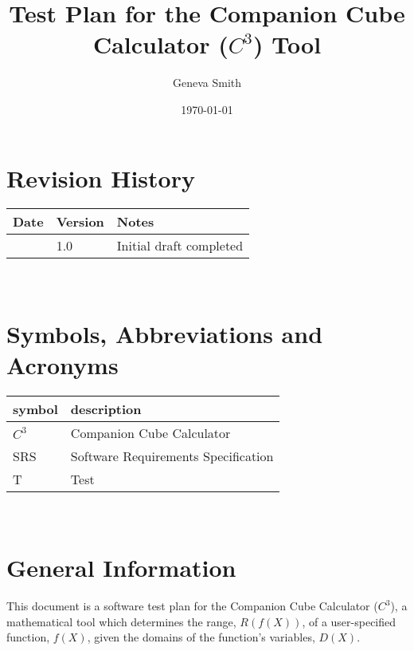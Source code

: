 \documentclass[12pt, titlepage]{article}
\newcommand{\progname}{Companion Cube Calculator} %
\newcommand{\prognameAbbrv}{$C^{3}$}
\begin{document}
\title{Test Plan for the \progname{} (\prognameAbbrv{}) Tool} 
\author{Geneva Smith}
\date{\today}
	
\maketitle


\section{Revision History}

\begin{tabularx}{\textwidth}{p{3cm}p{2cm}X}
\toprule {\bf Date} & {\bf Version} & {\bf Notes}\\
\midrule
 & 1.0 & Initial draft completed\\
\bottomrule
\end{tabularx}

~\newpage

\section{Symbols, Abbreviations and Acronyms}

\renewcommand{\arraystretch}{1.2}
\begin{tabular}{l l} 
  \toprule		
  \textbf{symbol} & \textbf{description}\\
  \midrule 
  \prognameAbbrv{} & \progname{}\\
  SRS & Software Requirements Specification\\
  T & Test\\
  \bottomrule
\end{tabular}\\


\newpage

\tableofcontents

\listoftables

\listoffigures

\newpage


\section{General Information}
This document is a software test plan for the \progname{} (\prognameAbbrv{}), a 
mathematical tool which determines the range, $R(f(X))$, of a user-specified 
function, $f(X)$, given the domains of the function's variables, $D(X)$.
\end{document}
